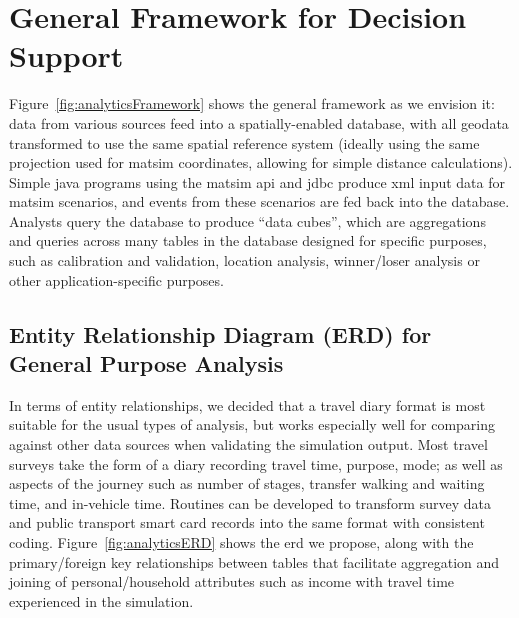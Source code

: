 \section{General Framework for Decision Support}
Figure~\ref{fig:analyticsFramework} shows the general framework as we envision it: data from various sources feed into a spatially-enabled database, with all geodata transformed to use the same spatial reference system (ideally using the same projection used for \gls{matsim} coordinates, allowing for simple distance calculations). Simple \gls{java} programs using the \gls{matsim} \gls{api} and \gls{jdbc} produce \gls{xml} input data for \gls{matsim} scenarios, and events from these scenarios are fed back into the database. Analysts query the database to produce ``data cubes'', which are aggregations and queries across many tables in the database designed for specific purposes, such as calibration and validation, location analysis, winner/loser analysis or other application-specific purposes.

\subsection{Entity Relationship Diagram (ERD) for General Purpose Analysis}
In terms of entity relationships, we decided that a travel diary format is most suitable for the usual types of analysis, but works especially well for comparing against other data sources when validating the simulation output. Most travel surveys take the form of a diary recording travel time, purpose, mode; as well as aspects of the journey such as number of stages, transfer walking and waiting time, and in-vehicle time. Routines can be developed to transform survey data  and public transport smart card records into the same format with consistent coding. Figure~\ref{fig:analyticsERD} shows the \gls{erd} we propose, along with the primary/foreign key relationships between tables that facilitate aggregation and joining of \eg personal/household attributes such as income with travel time experienced in the simulation.

